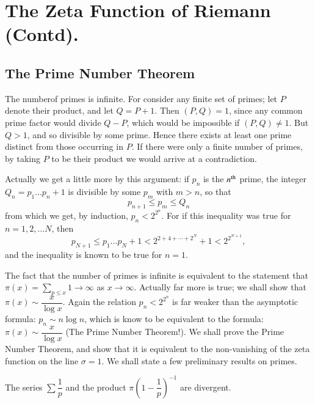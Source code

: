 \chapter{The Zeta Function of Riemann (Contd).}\label{chap17}

\setcounter{section}{11}
\section[The Prime Number Theorem]{The Prime Number Theorem \cite[pp.1-18]{key11}}\label{chap17:sec12}
 The number\pageoriginale of
primes is infinite. For consider any finite set of primes; let $P$
denote their product, and let $Q=P+1$. Then $(P,Q)=1$, since any
common prime factor would divide $Q-P$, which would be impossible if
$(P,Q) \neq 1$. But $Q>1$, and so divisible by some prime. Hence there
exists at least one prime distinct from those occurring in $P$. If
there were only a finite number of primes, by taking $P$ to be their
product we would arrive at a contradiction.

Actually we get a little more by this argument: if $p_n$ is the
$n^{\rm th}$ prime, the integer $Q_{n} = p_1 \ldots p_n+1$ is
divisible by some $p_m$ with $m>n$, so that
$$
p_{n+1} \leq p_m \leq Q_n
$$
from which we get, by induction, $p_n < 2^{2^n}$. For if this
inequality was true for $n=1,2,\ldots N$, then 
$$
p_{N+1} \leq p_1 \ldots p_N + 1 < 2^{2+4+\cdots + 2^N} + 1 < 2^{2^{N+1}},
$$
and the inequality is known to be true for $n=1$.

The fact that the number of primes is infinite is equivalent to the
statement that $\pi (x) = \sum\limits_{p\leq x} 1 \to \infty$ as $x \to
\infty$. Actually far more is true; we shall show that $\pi(x) \sim
\dfrac{x}{\log x}$. Again the relation $p_n< 2^{2^n}$ is far weaker
than the asymptotic formula: $p_n \sim n \log n$, which\pageoriginale
is know to be equivalent to the formula: $\pi (x) \sim \dfrac{x}{\log
  x}$ (The Prime Number Theorem!). We shall prove the Prime Number
Theorem, and show that it is equivalent to the non-vanishing of the
zeta function on the line $\sigma =1$. We shall state a few
preliminary results on primes.


\begin{thm}\label{chap17:thm1}
The series $\sum \dfrac{1}{p}$ and the product $\pi
\left(1-\dfrac{1}{p} \right)^{-1}$ are divergent.
\end{thm}

